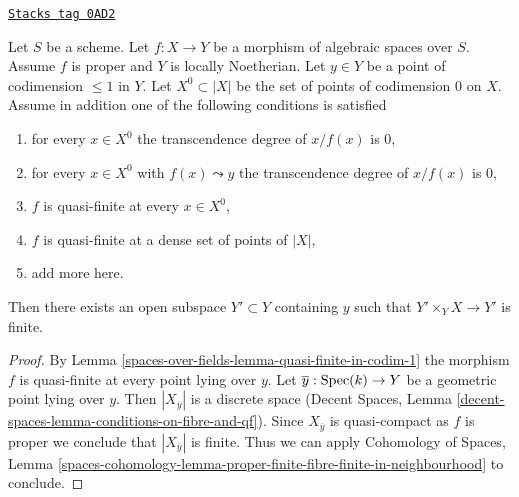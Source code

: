 \begin{lemma}
\label{spaces-over-fields-lemma-finite-in-codim-1}
\href{https://stacks.math.columbia.edu/tag/0AD2}{\texttt{Stacks tag 0AD2}}

Let $S$ be a scheme. Let $f : X \to Y$ be a morphism of algebraic spaces
over $S$. Assume $f$ is proper and $Y$ is locally Noetherian.
Let $y \in Y$ be a point of codimension $\leq 1$ in $Y$.
Let $X^0 \subset |X|$ be the set of points of codimension $0$ on $X$.
Assume in addition one of the
following conditions is satisfied
\begin{enumerate}
\item for every $x \in X^0$ the transcendence degree of $x/f(x)$ is $0$,
\item for every $x \in X^0$ with $f(x) \leadsto y$ the transcendence degree
of $x/f(x)$ is $0$,
\item $f$ is quasi-finite at every $x \in X^0$,
\item $f$ is quasi-finite at a dense set of points of $|X|$,
\item add more here.
\end{enumerate}
Then there exists an open subspace $Y' \subset Y$ containing $y$ such that
$Y' \times_Y X \to Y'$ is finite.
\end{lemma}

\begin{proof}
By Lemma \ref{spaces-over-fields-lemma-quasi-finite-in-codim-1} the morphism $f$ is
quasi-finite at every point lying over $y$. Let $\overline{y} : \operatorname{Spec}(k) \to Y$
be a geometric point lying over $y$. Then $|X_{\overline{y}}|$ is a
discrete space (Decent Spaces, Lemma
\ref{decent-spaces-lemma-conditions-on-fibre-and-qf}).
Since $X_{\overline{y}}$ is quasi-compact as $f$ is proper we conclude
that $|X_{\overline{y}}|$ is finite.
Thus we can apply Cohomology of Spaces, Lemma
\ref{spaces-cohomology-lemma-proper-finite-fibre-finite-in-neighbourhood}
to conclude.
\end{proof}

